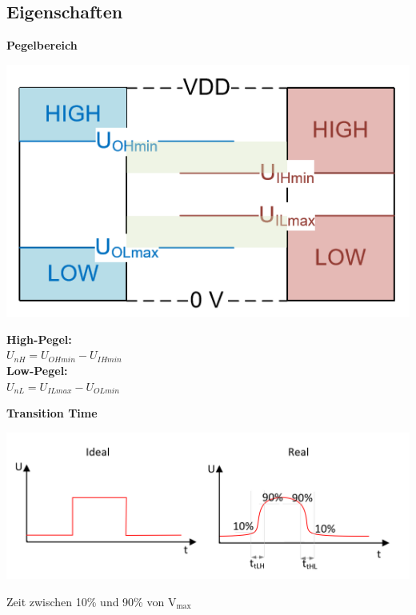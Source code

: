 \subsection{Eigenschaften}
\noindent\begin{minipage}{\textwidth}
	\noindent\textbf{Pegelbereich}

	\begin{minipage}{0.25\textwidth}
		\includegraphics[width=0.8\linewidth,keepaspectratio=true]{./Images/Pegelbereich.png}
	\end{minipage}%
	\begin{minipage}{0.25\textwidth}

		\textbf{High-Pegel:}\\ $U_{nH} = U_{OHmin} - U_{IHmin}$ \\
		\textbf{Low-Pegel:}\\ $U_{nL} = U_{ILmax} - U_{OLmin}$
	\end{minipage}
\end{minipage}

\noindent\begin{minipage}{\textwidth}
	\noindent\textbf{Transition Time}
	
	\begin{minipage}{0.25\textwidth}
		\includegraphics[width=\linewidth,keepaspectratio=true]{./Images/transitiontime.png}
	\end{minipage}%
	\begin{minipage}{0.2\textwidth}
		Zeit zwischen 10\% und 90\% von V$_\text{max}$\\
	\end{minipage}
\end{minipage}


